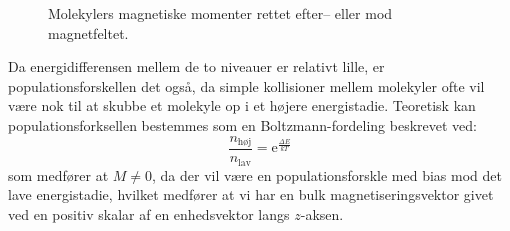     \begin{figure}[H]
        \caption{Molekylers magnetiske momenter rettet efter-- eller mod magnetfeltet.}
    \end{figure}
    Da energidifferensen mellem de to niveauer er relativt lille, er populationsforskellen det også, da simple kollisioner mellem molekyler ofte vil være nok til at skubbe et molekyle op i et højere energistadie. Teoretisk kan populationsforksellen bestemmes som en Boltzmann-fordeling beskrevet ved:
    \[
        \frac{n_{\text{høj}}}{n_{\text{lav}}}=\mathrm{e}^{\frac{\Delta E}{kT}}
    \]
    som medfører at $M \neq 0$, da der vil være en populationsforskle med bias mod det lave energistadie, hvilket medfører at vi har en bulk magnetiseringsvektor givet ved en positiv skalar af en enhedsvektor langs $z$-aksen.
